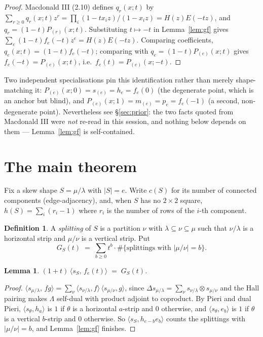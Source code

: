 \documentclass[11pt]{article}
\newtheorem{lemma}[theorem]{Lemma}
\theoremstyle{definition}
\newtheorem{definition}[theorem]{Definition}
\newcommand{\Lam}{\Lambda}
\begin{document}
\begin{proof}
Macdonald III (2.10) defines $q_r(x;t)$ by $\sum_{r\ge0}q_r(x;t)z^r=\prod_i(1-tx_iz)/(1-x_iz)
=H(z)E(-tz)$, and $q_r=(1-t)P_{(r)}(x;t)$. Substituting $t\mapsto-t$ in Lemma~\ref{lem:gf}
gives $\sum_e(1-t)f_e(-t)z^e=H(z)E(-tz)$. Comparing coefficients, $q_e(x;t)=(1-t)f_e(-t)$;
comparing with $q_e=(1-t)P_{(e)}(x;t)$ gives $f_e(-t)=P_{(e)}(x;t)$, i.e.\ $f_e(t)=P_{(e)}(x;-t)$.
\end{proof}

Two independent specialisations pin this identification rather than merely shape-matching it:
$P_{(e)}(x;0)=s_{(e)}=h_e=f_e(0)$ (the degenerate point, which is an anchor but blind), and
$P_{(e)}(x;1)=m_{(e)}=p_e=f_e(-1)$ (a second, non-degenerate point). Nevertheless see
\S\ref{sec:prior}: the two facts quoted from Macdonald III were \emph{not} re-read in this
session, and nothing below depends on them --- Lemma~\ref{lem:gf} is self-contained.

\section{The main theorem}

Fix a skew shape $S=\mu/\lambda$ with $|S|=e$. Write $c(S)$ for its number of connected
components (edge-adjacency), and, when $S$ has no $2\times2$ square, $h(S)=\sum_i(r_i-1)$ where
$r_i$ is the number of rows of the $i$-th component.

\begin{definition}
A \emph{splitting} of $S$ is a partition $\nu$ with $\lambda\subseteq\nu\subseteq\mu$ such that
$\nu/\lambda$ is a horizontal strip and $\mu/\nu$ is a vertical strip. Put
\[
G_S(t)\;=\;\sum_{b\ge0}t^{b}\cdot\#\{\text{splittings with }|\mu/\nu|=b\}.
\]
\end{definition}

\begin{lemma}\label{lem:coprod}
$(1+t)\,\langle s_S,\,f_e(t)\rangle \;=\; G_S(t)$.
\end{lemma}

\begin{proof}
$\langle s_{\mu/\lambda},\,fg\rangle=\sum_\nu\langle s_{\nu/\lambda},f\rangle\,
\langle s_{\mu/\nu},g\rangle$, since $\Delta s_{\mu/\lambda}=\sum_\nu s_{\nu/\lambda}\otimes
s_{\mu/\nu}$ and the Hall pairing makes $\Lam$ self-dual with product adjoint to coproduct. By
Pieri and dual Pieri, $\langle s_\theta,h_a\rangle$ is $1$ if $\theta$ is a horizontal
$a$-strip and $0$ otherwise, and $\langle s_\theta,e_b\rangle$ is $1$ if $\theta$ is a vertical
$b$-strip and $0$ otherwise. So $\langle s_S,h_{e-b}e_b\rangle$ counts the splittings with
$|\mu/\nu|=b$, and Lemma~\ref{lem:gf} finishes.
\end{proof}
\end{document}
